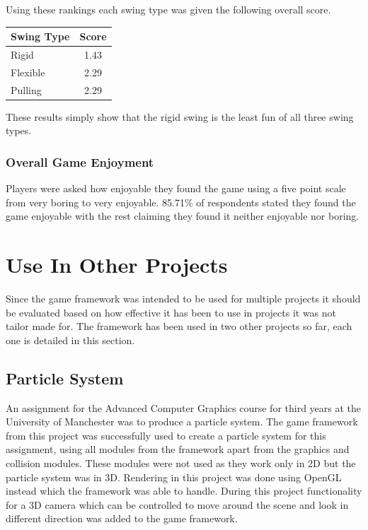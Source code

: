 \documentclass[]{report}
\begin{document}
			Using these rankings each swing type was given the following overall score.
			
			\begin{tabular}[H]{ l || c }
				Swing Type & Score \\
				\hline
				Rigid & 1.43 \\
				Flexible & 2.29 \\
				Pulling & 2.29 \\
			\end{tabular}
			
			These results simply show that the rigid swing is the least fun of all three swing types.
			
			\subsubsection{Overall Game Enjoyment}
			Players were asked how enjoyable they found the game using a five point scale from very boring to very enjoyable. 85.71\% of respondents stated they found the game enjoyable with the rest claiming they found it neither enjoyable nor boring.
			
	\section{Use In Other Projects}
	Since the game framework was intended to be used for multiple projects it should be evaluated based on how effective it has been to use in projects it was not tailor made for. The framework has been used in two other projects so far, each one is detailed in this section.
		\subsection{Particle System}
		An assignment for the Advanced Computer Graphics course for third years at the University of Manchester was to produce a particle system. The game framework from this project was successfully used to create a particle system for this assignment, using all modules from the framework apart from the graphics and collision modules. These modules were not used as they work only in 2D but the particle system was in 3D. Rendering in this project was done using OpenGL instead which the framework was able to handle. During this project functionality for a 3D camera which can be controlled to move around the scene and look in different direction was added to the game framework.
		
\end{document}
